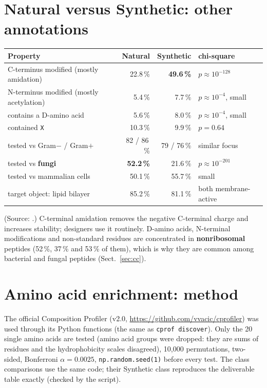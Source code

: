 \documentclass[11pt,a4paper]{article}
\begin{document}
\section{Natural versus Synthetic: other annotations}
\begin{table}[H]\centering\small
\begin{tabular}{lrrl}
\toprule
Property & Natural & Synthetic & chi-square\\\midrule
C-terminus modified (mostly amidation) & 22.8\,\% & \textbf{49.6\,\%} & $p\approx10^{-128}$\\
N-terminus modified (mostly acetylation) & 5.4\,\% & 7.7\,\% & $p\approx10^{-4}$, small\\
contains a D-amino acid & 5.6\,\% & 8.0\,\% & $p\approx10^{-4}$, small\\
contained \texttt{X} & 10.3\,\% & 9.9\,\% & $p=0.64$\\
tested vs Gram$-$ / Gram$+$ & 82 / 86\,\% & 79 / 76\,\% & similar focus\\
tested vs \textbf{fungi} & \textbf{52.2\,\%} & 21.6\,\% & $p\approx10^{-201}$\\
tested vs mammalian cells & 50.1\,\% & 55.7\,\% & small\\
target object: lipid bilayer & 85.2\,\% & 81.1\,\% & both membrane-active\\\bottomrule
\end{tabular}
\end{table}
(Source: .)
C-terminal amidation removes the negative C-terminal charge and increases stability; designers use it routinely. D-amino acids, N-terminal modifications and non-standard residues
are concentrated in \textbf{nonribosomal} peptides (52\,\%, 37\,\% and 53\,\% of them), which is why they are common among bacterial and fungal peptides (Sect.~\ref{sec:cc}).

\section{Amino acid enrichment: method}
The official Composition Profiler \cite{vacic2007} (v2.0, \url{https://github.com/vvacic/cprofiler}) was used through its Python functions (the same as \texttt{cprof discover}).
Only the 20 single amino acids are tested (amino acid groups were dropped: they are sums of residues and the hydrophobicity scales disagreed), 10{,}000 permutations,
two-sided, Bonferroni $\alpha = 0.0025$, \texttt{np.random.seed(1)} before every test. The class comparisons use the same code; their Synthetic class reproduces the deliverable table exactly
(checked by the script).
\end{document}
